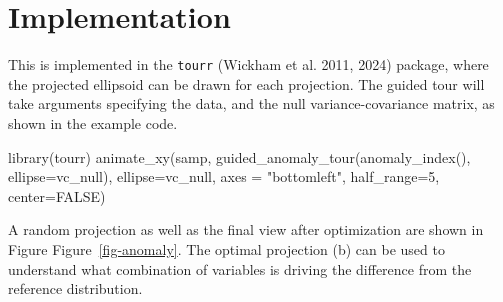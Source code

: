 \documentclass[
  12pt,
]{interact}
\newenvironment{Shaded}{\begin{snugshade}}{\end{snugshade}}
\newcommand{\AttributeTok}[1]{\textcolor[rgb]{0.40,0.45,0.13}{#1}}
\newcommand{\ConstantTok}[1]{\textcolor[rgb]{0.56,0.35,0.01}{#1}}
\newcommand{\DecValTok}[1]{\textcolor[rgb]{0.68,0.00,0.00}{#1}}
\newcommand{\FunctionTok}[1]{\textcolor[rgb]{0.28,0.35,0.67}{#1}}
\newcommand{\NormalTok}[1]{\textcolor[rgb]{0.00,0.23,0.31}{#1}}
\newcommand{\StringTok}[1]{\textcolor[rgb]{0.13,0.47,0.30}{#1}}
\begin{document}
\section{Implementation}\label{sec-implementation}

This is implemented in the \texttt{tourr} (Wickham et al. 2011, 2024)
package, where the projected ellipsoid can be drawn for each projection.
The guided tour will take arguments specifying the data, and the null
variance-covariance matrix, as shown in the example code.

\begin{Shaded}
\begin{Highlighting}[]
\FunctionTok{library}\NormalTok{(tourr)}
\FunctionTok{animate\_xy}\NormalTok{(samp, }\FunctionTok{guided\_anomaly\_tour}\NormalTok{(}\FunctionTok{anomaly\_index}\NormalTok{(),}
  \AttributeTok{ellipse=}\NormalTok{vc\_null), }\AttributeTok{ellipse=}\NormalTok{vc\_null, }
  \AttributeTok{axes =} \StringTok{"bottomleft"}\NormalTok{, }\AttributeTok{half\_range=}\DecValTok{5}\NormalTok{, }\AttributeTok{center=}\ConstantTok{FALSE}\NormalTok{)}
\end{Highlighting}
\end{Shaded}

A random projection as well as the final view after optimization are
shown in Figure Figure~\ref{fig-anomaly}. The optimal projection (b) can
be used to understand what combination of variables is driving the
difference from the reference distribution.
\end{document}
